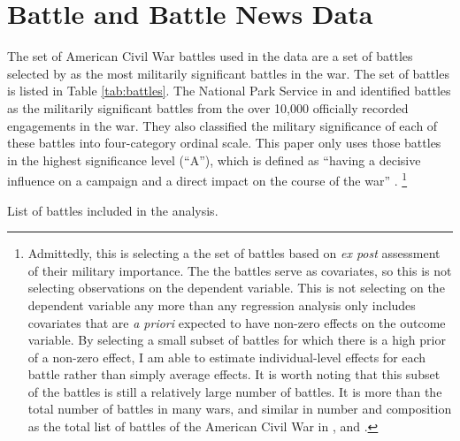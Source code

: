 \documentclass[11pt, oneside, article]{memoir}
\begin{document}
\section{Battle and Battle News Data}
\label{sec:battle-data}

The set of American Civil War battles used in the data are a set of \AcwBattleNumSigA{} battles selected by \textcite{CWSAC1993} as the most militarily significant battles in the war. 
The set of battles is listed in Table \ref{tab:battles}.
The National Park Service in \textcite{CWSAC1993} and \textcite{CWSAC1993b} identified \AcwBattleNum{} battles as the militarily significant battles from the over 10,000 officially recorded engagements in the war.
They also classified the military significance of each of these battles into four-category ordinal scale.
This paper only uses those battles in the highest significance level (``A''), which is defined as ``having a decisive influence on a campaign and a direct impact on the course of the war'' \parencite{CWSAC1993}.%
\footnote{
  Admittedly, this is selecting a the set of battles based on \textit{ex post} assessment of their military importance.
  The the battles serve as covariates, so this is not selecting observations on the dependent variable.
  This is not selecting on the dependent variable any more than any regression analysis only includes covariates that are \textit{a priori} expected to have non-zero effects on the outcome variable.
  By selecting a small subset of battles for which there is a high prior of a non-zero effect, I am able to estimate individual-level effects for each battle rather than simply average effects.
  It is worth noting that this subset of the battles is still a relatively large number of battles. It is more than the total number of battles in many wars, and similar in number and composition as the total list of battles of the American Civil War in \textcite{Livermore1900}, \textcite{Bodart1908} and \textcite{cdb90}.
}

\begin{table}
  \tiny
  
  \caption{List of battles included in the analysis.}
  \label{tab:battles}
\end{table}
\end{document}
